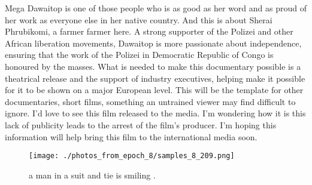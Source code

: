 \documentclass{article}%
\begin{document}
Mega Dawaitop is one of those people who is as good as her word and as proud of her work as everyone else in her native country. And this is about Sherai Phrubikomi, a farmer farmer here. A strong supporter of the Polizei and other African liberation movements, Dawaitop is more passionate about independence, ensuring that the work of the Polizei in Democratic Republic of Congo is honoured by the masses.\newline%
What is needed to make this documentary possible is a theatrical release and the support of industry executives, helping make it possible for it to be shown on a major European level. This will be the template for other documentaries, short films, something an untrained viewer may find difficult to ignore. I’d love to see this film released to the media. I’m wondering how it is this lack of publicity leads to the arrest of the film’s producer. I’m hoping this information will help bring this film to the international media soon.\newline%

%


\begin{figure}[h!]%
\centering%
\texttt{[image: ./photos\_from\_epoch\_8/samples\_8\_209.png]}%
\caption{a man in a suit and tie is smiling .}%
\end{figure}

%
\end{document}

